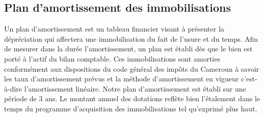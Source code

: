 \subsection{Plan d'amortissement des immobilisations}
Un plan d'amortissement est un tableau financier visant à présenter la dépréciation qui affectera une immobilisation du fait de l'usure et du temps. Afin de mesurer dans la durée l'amortissement, un plan est établi dès que le bien est porté à l'actif du bilan comptable. Ces immobilisations sont amorties conformément aux dispositions du code général des impôts du Cameroun à savoir les taux d'amortissement prévus et la méthode d'amortissement en vigueur c'est-à-dire l'amortissement linéaire.
Notre plan d'amortissement est établi sur une période de 3 ans. Le montant annuel des dotations reflète bien l'étalement dans le temps du programme d'acquisition des immobilisations tel qu'exprimé plus haut.

